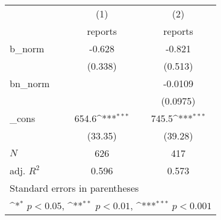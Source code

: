 {
\def\sym#1{\ifmmode^{#1}\else\(^{#1}\)\fi}
\begin{tabular}{l*{2}{c}}
\hline\hline
            &\multicolumn{1}{c}{(1)}&\multicolumn{1}{c}{(2)}\\
            &\multicolumn{1}{c}{reports}&\multicolumn{1}{c}{reports}\\
\hline
b\_norm      &      -0.628         &      -0.821         \\
            &     (0.338)         &     (0.513)         \\
[1em]
bn\_norm     &                     &     -0.0109         \\
            &                     &    (0.0975)         \\
[1em]
\_cons      &       654.6\sym{***}&       745.5\sym{***}\\
            &     (33.35)         &     (39.28)         \\
\hline
\(N\)       &         626         &         417         \\
adj. \(R^{2}\)&       0.596         &       0.573         \\
\hline\hline
\multicolumn{3}{l}{\footnotesize Standard errors in parentheses}\\
\multicolumn{3}{l}{\footnotesize \sym{*} \(p<0.05\), \sym{**} \(p<0.01\), \sym{***} \(p<0.001\)}\\
\end{tabular}
}
